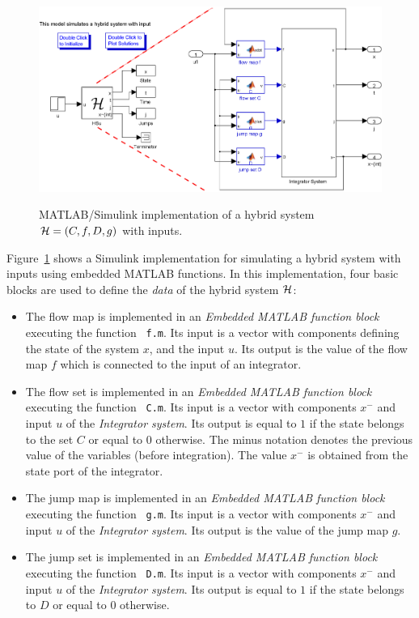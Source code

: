 \documentclass{article}
\begin{document}
\begin{figure}[ht]
  \begin{center}
    {\includegraphics[width=.75\textwidth]{figures/Simulink/HSinput.eps}}
\caption{MATLAB/Simulink implementation of a hybrid system $\mathcal{H} =(C,f,D,g)$ with inputs.}
\label{fig:HSinput}
  \end{center}
\end{figure}

Figure~\ref{fig:HSinput} shows a Simulink implementation for simulating a hybrid system with inputs using embedded MATLAB functions. In this implementation, four basic blocks are used to define the {\em data} of the hybrid system $\mathcal{H}$:
\begin{itemize}
\item The flow map is implemented in an {\em Embedded MATLAB function block} executing the function {\tt
f.m}. Its input is a vector with components defining the state of the system $x$, and the input $u$.
Its output is the value of the flow map $f$ which is connected to the  input of an integrator.
\item The flow set is implemented in an {\em Embedded MATLAB function block} executing the function {\tt
C.m}. Its input is a vector with components $x^-$ and input $u$ of the {\em Integrator system}. Its output is equal to $1$ if the state belongs to the set $C$ or equal to $0$ otherwise.
The minus notation denotes the previous value of the variables (before integration). The value $x^-$ is obtained from the state port of the integrator.
\item The jump map is implemented in an {\em Embedded MATLAB function block} executing the function {\tt
g.m}. Its input is a vector with components $x^-$ and input $u$ of the {\em Integrator system}. Its output is the value of the jump map $g$.
\item The jump set is implemented in an {\em Embedded MATLAB function block} executing the function {\tt
D.m}. Its input is a vector with components $x^-$ and input $u$ of the {\em Integrator system}. Its output is equal to $1$ if the state belongs to $D$ or equal to $0$ otherwise.
\end{itemize}
\end{document}
